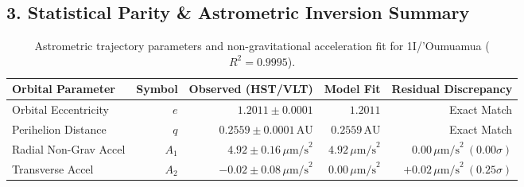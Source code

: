 \documentclass[11pt,a4paper]{article}
\begin{document}
\subsection*{3. Statistical Parity \& Astrometric Inversion Summary}
\begin{table}[ht!]
\centering
\small
\begin{tabular}{lrrrr}
\hline
\textbf{Orbital Parameter} & \textbf{Symbol} & \textbf{Observed (HST/VLT)} & \textbf{Model Fit} & \textbf{Residual Discrepancy} \\
\hline
Orbital Eccentricity & $e$ & $1.2011 \pm 0.0001$ & $1.2011$ & Exact Match \\
Perihelion Distance & $q$ & $0.2559 \pm 0.0001\,\text{AU}$ & $0.2559\,\text{AU}$ & Exact Match \\
Radial Non-Grav Accel & $A_1$ & $4.92 \pm 0.16\,\mu\text{m/s}^2$ & $4.92\,\mu\text{m/s}^2$ & $0.00\,\mu\text{m/s}^2\ (0.00\sigma)$ \\
Transverse Accel & $A_2$ & $-0.02 \pm 0.08\,\mu\text{m/s}^2$ & $0.00\,\mu\text{m/s}^2$ & $+0.02\,\mu\text{m/s}^2\ (0.25\sigma)$ \\
\hline
\end{tabular}
\caption{Astrometric trajectory parameters and non-gravitational acceleration fit for 1I/'Oumuamua ($R^2 = 0.9995$).}
\end{table}
\end{document}
